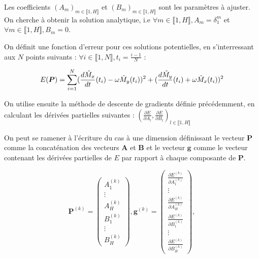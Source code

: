 \documentclass[12pt]{report}
\begin{document}
Les coefficients $(A_m)_{m\in \llbracket 1,H \rrbracket}$ et $(B_m)_{m\in \llbracket 1,H \rrbracket}$ sont les paramètres à ajuster.
On cherche à obtenir la solution analytique, i.e $\forall m \in\llbracket 1,H \rrbracket, A_m = \delta _1 ^m $ et $\forall m \in\llbracket 1,H \rrbracket, B_m = 0 $. 

On définit une fonction d'erreur pour ces solutions potentielles, en s'interressant aux $N$ points suivants : $\forall i \in\llbracket 1,N \rrbracket, t_i = \frac{i-1}{N} $ :

\begin{equation}
        E(\bm{P}) = \sum_{i=1}^{N} (\frac{d\Tilde{M}_x}{dt}(t_i) - \omega \Tilde{M}_y(t_i))^2 + (\frac{d\Tilde{M}_y}{dt}(t_i) + \omega \Tilde{M}_x(t_i))^2
\label{eq:erreur descente gradient couplées}
\end{equation}

On utilise ensuite la méthode de descente de gradients définie précédemment, en calculant les dérivées partielles suivantes :
$(\frac{\partial E}{\partial A_l}, \frac{\partial E}{\partial B_l})_{l \in \llbracket 1,H \rrbracket}$

On peut se ramener à l'écriture du cas à une dimension définissant le vecteur $\bm{P}$ comme la concaténation des vecteurs $\bm{A}$ et $\bm{B}$ et le vecteur $\bm{g}$ comme le vecteur contenant les dérivées  partielles de $E$ par rapport à chaque composante de $\bm{P}$. 

\begin{equation}
    \bm{P}^{(k)} = \begin{pmatrix}
                A_1^{(k)} \\
                \vdots \\
                A_H^{(k)} \\
                B_1^{(k)} \\
                \vdots \\
                B_H^{(k)}
              \end{pmatrix},
    \bm{g}^{(k)} = \begin{pmatrix}
                \frac{\partial E^{(k)}}{\partial A_1^{(k)}} \\
                \vdots \\
                \frac{\partial E^{(k)}}{\partial A_H^{(k)}} \\
                \frac{\partial E^{(k)}}{\partial B_1^{(k)}} \\
                \vdots \\
                \frac{\partial E^{(k)}}{\partial B_H^{(k)}} 
              \end{pmatrix},     
\label{eq:définition descente de gradients 2D}
\end{equation}
\end{document}
